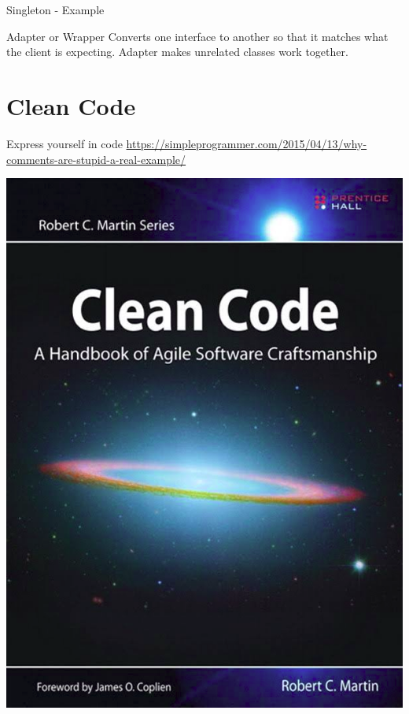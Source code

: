 \documentclass{beamer}
\begin{document}
\begin{frame}{Singleton - Example}

\end{frame}

\begin{frame}{Adapter or Wrapper}
Converts one interface to another so that it matches what the client is
expecting. Adapter makes unrelated classes work together.
\end{frame}

\part{Clean Code}
\begin{frame}{Express yourself in code}
\url{https://simpleprogrammer.com/2015/04/13/why-comments-are-stupid-a-real-example/}
\end{frame}

\begin{frame}
\includegraphics[scale=0.25]{img/CleanCode.png}
\end{frame}
\end{document}
